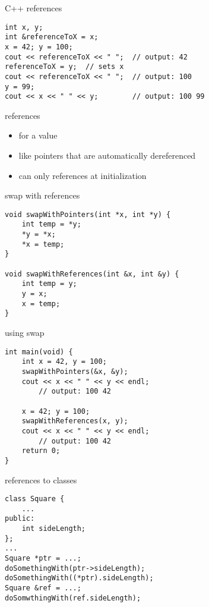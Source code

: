 \begin{frame}[fragile,label=cppReferences]{C++ references}
\lstset{
    language=C++,
    style=small
}
\begin{lstlisting}
int x, y;
int &referenceToX = x;
x = 42; y = 100;
cout << referenceToX << " ";  // output: 42
referenceToX = y;  // sets x
cout << referenceToX << " ";  // output: 100
y = 99;
cout << x << " " << y;        // output: 100 99
\end{lstlisting}
\end{frame}

\begin{frame}{references}
    \begin{itemize}
    \item {} for a value
    \item like pointers that are automatically dereferenced
    \item can only  references at initialization
    \end{itemize}
\end{frame}

\begin{frame}[fragile,label=swapRef]{swap with references}
\lstset{
    language=C++,
    style=small
}
\begin{lstlisting}
void swapWithPointers(int *x, int *y) {
    int temp = *y;
    *y = *x;
    *x = temp;
}

void swapWithReferences(int &x, int &y) {
    int temp = y;
    y = x;
    x = temp;
}
\end{lstlisting}
\end{frame}

\begin{frame}[fragile,label=usingSwap]{using swap}
\lstset{
    language=C++,
    style=small
}
\begin{lstlisting}
int main(void) {
    int x = 42, y = 100;
    swapWithPointers(&x, &y);
    cout << x << " " << y << endl; 
        // output: 100 42

    x = 42; y = 100;
    swapWithReferences(x, y);
    cout << x << " " << y << endl; 
        // output: 100 42
    return 0;
}
\end{lstlisting}
\end{frame}

\begin{frame}[fragile,label=refToClass]{references to classes}
\begin{lstlisting}
class Square {
    ...
public:
    int sideLength;
};
...
Square *ptr = ...;
doSomethingWith(ptr->sideLength);
doSomethingWith((*ptr).sideLength);
Square &ref = ...;
doSomwthingWith(ref.sideLength);
\end{lstlisting}
\end{frame}
